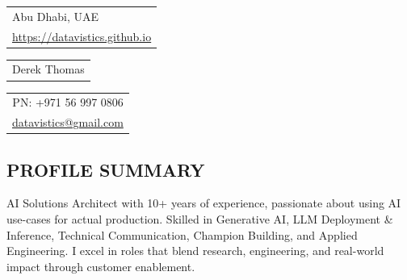 \documentclass[margin, line]{res} %
\begin{document}
\sffamily
{\small\begin{tabular}[c]{l}
  Abu Dhabi, UAE\\
\href{https://datavistics.github.io}{https://datavistics.github.io}
\end{tabular}}\hfill%
{\Large\bfseries\begin{tabular}[c]{c}
  Derek Thomas
\end{tabular}}\hfill%
{\small\begin{tabular}[c]{r}
  PN: +971 56 997 0806 \\
  \href{mailto:datavistics@gmail.com}{datavistics@gmail.com}\\
\end{tabular}}%

\begin{resume}


\section{PROFILE SUMMARY}
AI Solutions Architect with 10+ years of experience, passionate about using AI use-cases for actual production. Skilled in Generative AI, LLM Deployment \& Inference, Technical Communication, Champion Building, and Applied Engineering. I excel in roles that blend research, engineering, and real-world impact through customer enablement.



\end{resume}
\end{document}
